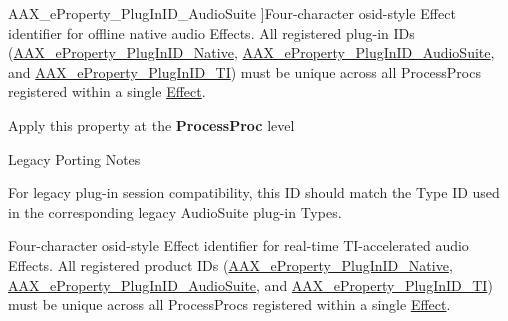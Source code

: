 \begin{Desc}
\begin{description}
{\hypertarget{a00283_a6571f4e41a5dd06e4067249228e2249ead3344696b8298a8b254add3d039ea927}{}A\+A\+X\+\_\+e\+Property\+\_\+\+Plug\+In\+I\+D\+\_\+\+Audio\+Suite\label{a00283_a6571f4e41a5dd06e4067249228e2249ead3344696b8298a8b254add3d039ea927}
}]Four-\/character osid-\/style Effect identifier for offline native audio Effects. All registered plug-\/in I\+Ds (\hyperlink{a00283_a6571f4e41a5dd06e4067249228e2249ea89ca3dd6e96895cda14976c1b1ceb826}{A\+A\+X\+\_\+e\+Property\+\_\+\+Plug\+In\+I\+D\+\_\+\+Native}, \hyperlink{a00283_a6571f4e41a5dd06e4067249228e2249ead3344696b8298a8b254add3d039ea927}{A\+A\+X\+\_\+e\+Property\+\_\+\+Plug\+In\+I\+D\+\_\+\+Audio\+Suite}, and \hyperlink{a00283_a6571f4e41a5dd06e4067249228e2249ea75f174df4efbeca86eaada126c1d9214}{A\+A\+X\+\_\+e\+Property\+\_\+\+Plug\+In\+I\+D\+\_\+\+T\+I}) must be unique across all Process\+Procs registered within a single \hyperlink{a00096}{Effect}.

\begin{DoxyItemize}
\item Apply this property at the {\bfseries Process\+Proc} level\end{DoxyItemize}
\begin{DoxyRefDesc}{Legacy Porting Notes}
\item[\hyperlink{a00384__porting_notes000044}{Legacy Porting Notes}]For legacy plug-\/in session compatibility, this I\+D should match the Type I\+D used in the corresponding legacy Audio\+Suite plug-\/in Types. \end{DoxyRefDesc}
\item[{\em 
\hypertarget{a00283_a6571f4e41a5dd06e4067249228e2249ea75f174df4efbeca86eaada126c1d9214}{}A\+A\+X\+\_\+e\+Property\+\_\+\+Plug\+In\+I\+D\+\_\+\+T\+I\label{a00283_a6571f4e41a5dd06e4067249228e2249ea75f174df4efbeca86eaada126c1d9214}
}]Four-\/character osid-\/style Effect identifier for real-\/time T\+I-\/accelerated audio Effects. All registered product I\+Ds (\hyperlink{a00283_a6571f4e41a5dd06e4067249228e2249ea89ca3dd6e96895cda14976c1b1ceb826}{A\+A\+X\+\_\+e\+Property\+\_\+\+Plug\+In\+I\+D\+\_\+\+Native}, \hyperlink{a00283_a6571f4e41a5dd06e4067249228e2249ead3344696b8298a8b254add3d039ea927}{A\+A\+X\+\_\+e\+Property\+\_\+\+Plug\+In\+I\+D\+\_\+\+Audio\+Suite}, and \hyperlink{a00283_a6571f4e41a5dd06e4067249228e2249ea75f174df4efbeca86eaada126c1d9214}{A\+A\+X\+\_\+e\+Property\+\_\+\+Plug\+In\+I\+D\+\_\+\+T\+I}) must be unique across all Process\+Procs registered within a single \hyperlink{a00096}{Effect}.


\end{description}
\end{Desc}
